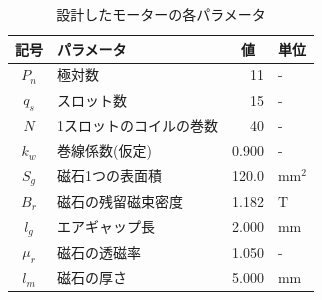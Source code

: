 \documentclass[twocolumn, a4paper, 10pt, fleqn]{ltjsarticle}
\begin{document}
\begin{table}[H]
    \centering
    \caption{設計したモーターの各パラメータ} %
    \label{tab:motor_params}
    \begin{tabular}{clrl}
        \toprule %
        記号 & パラメータ & \multicolumn{1}{c}{値} & 単位 \\ 
        \midrule %
        $P_n$      & 極対数                 & 11   & - \\
        $q_s$      & スロット数             & 15   & - \\
        $N$        & 1スロットのコイルの巻数 & 40   & - \\
        $k_w$      & 巻線係数(仮定)               & 0.900  & - \\
        $S_g$      & 磁石1つの表面積           & 120.0   & $\mathrm{mm^2}$ \\
        $B_r$      & 磁石の残留磁束密度      & 1.182  & $\mathrm{T}$ \\
        $l_g$      & エアギャップ長         & 2.000& $\mathrm{mm}$ \\
        $\mu_r$    & 磁石の透磁率           & 1.050 & - \\
        $l_m$      & 磁石の厚さ             & 5.000& $\mathrm{mm}$ \\
        \bottomrule %
    \end{tabular}
\end{table}
\end{document}
